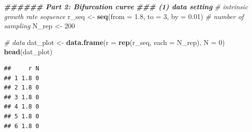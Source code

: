 \documentclass[
]{book}
\newenvironment{Shaded}{\begin{snugshade}}{\end{snugshade}}
\newcommand{\AttributeTok}[1]{\textcolor[rgb]{0.13,0.29,0.53}{#1}}
\newcommand{\CommentTok}[1]{\textcolor[rgb]{0.56,0.35,0.01}{\textit{#1}}}
\newcommand{\DecValTok}[1]{\textcolor[rgb]{0.00,0.00,0.81}{#1}}
\newcommand{\DocumentationTok}[1]{\textcolor[rgb]{0.56,0.35,0.01}{\textbf{\textit{#1}}}}
\newcommand{\FloatTok}[1]{\textcolor[rgb]{0.00,0.00,0.81}{#1}}
\newcommand{\FunctionTok}[1]{\textcolor[rgb]{0.13,0.29,0.53}{\textbf{#1}}}
\newcommand{\NormalTok}[1]{#1}
\newcommand{\OtherTok}[1]{\textcolor[rgb]{0.56,0.35,0.01}{#1}}
\begin{document}
\begin{Shaded}
\begin{Highlighting}[]
\DocumentationTok{\#\#\#\#\#\# Part 2: Bifurcation curve}
\DocumentationTok{\#\#\# (1) data setting}
\CommentTok{\# intrinsic growth rate sequence}
\NormalTok{r\_seq }\OtherTok{\textless{}{-}} \FunctionTok{seq}\NormalTok{(}\AttributeTok{from =} \FloatTok{1.8}\NormalTok{, }\AttributeTok{to =} \DecValTok{3}\NormalTok{, }\AttributeTok{by =} \FloatTok{0.01}\NormalTok{)}
\CommentTok{\# number of sampling}
\NormalTok{N\_rep }\OtherTok{\textless{}{-}} \DecValTok{200}

\CommentTok{\# data }
\NormalTok{dat\_plot }\OtherTok{\textless{}{-}} \FunctionTok{data.frame}\NormalTok{(}\AttributeTok{r =} \FunctionTok{rep}\NormalTok{(r\_seq, }\AttributeTok{each =}\NormalTok{ N\_rep), }\AttributeTok{N =} \DecValTok{0}\NormalTok{)}
\FunctionTok{head}\NormalTok{(dat\_plot)}
\end{Highlighting}
\end{Shaded}

\begin{verbatim}
##     r N
## 1 1.8 0
## 2 1.8 0
## 3 1.8 0
## 4 1.8 0
## 5 1.8 0
## 6 1.8 0
\end{verbatim}
\end{document}
